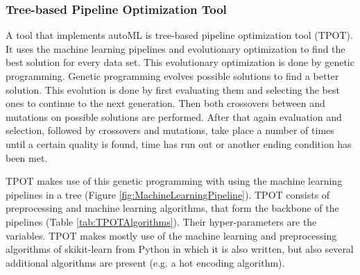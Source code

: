 \documentclass[10pt,a4paper]{article}
\begin{document}
	
	\subsubsection{Tree-based Pipeline Optimization Tool}
	\label{subsec:TPOT}
	
	A tool that implements autoML is tree-based pipeline optimization tool (TPOT). It uses the machine learning pipelines and evolutionary optimization to find the best solution for every data set. This evolutionary optimization is done by genetic programming. Genetic programming evolves possible solutions to find a better solution. This evolution is done by first evaluating them and selecting the best ones to continue to the next generation. Then both crossovers between and mutations on possible solutions are performed. After that again evaluation and selection, followed by crossovers and mutations, take place a number of times until a certain quality is found, time has run out or another ending condition has been met.
	
	TPOT makes use of this genetic programming with using the machine learning pipelines in a tree (Figure \ref{fig:MachineLearningPipeline}). TPOT consists of preprocessing and machine learning algorithms, that form the backbone of the pipelines (Table \ref{tab:TPOTAlgorithms}). Their hyper-parameters are the variables. TPOT makes mostly use of the machine learning and preprocessing algorithms of skikit-learn from Python in which it is also written, but also several additional algorithms are present (e.g. a hot encoding algorithm).
	
\end{document}
